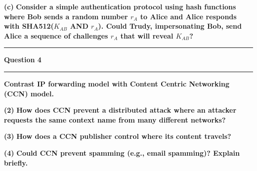 \documentclass[11pt]{article}
\newcommand\question[2]{\vspace{.25in}\hrule\textbf{#1}\vspace{.5em}\hrule\vspace{.10in}}
\renewcommand\part[1]{\vspace{.10in}\textbf{(#1)}}
\begin{document}
\part{c} \textbf{ Consider a simple authentication protocol using hash functions where
Bob sends a random number $r_A$ to Alice and Alice responds with SHA512($K_{AB}$
AND $r_A$). Could Trudy, impersonating Bob, send Alice a sequence of challenges
$r_A$ that will reveal $K_{AB}$?}

\question{Question 4}

\part{1} \textbf{Contrast IP forwarding model with Content Centric Networking (CCN) model.}

\part{2} \textbf{How does CCN prevent a distributed attack where an attacker requests the same context name from many different networks?}

\part{3} \textbf{How does a CCN publisher control where its content travels?}

\part{4} \textbf{Could CCN prevent spamming (e.g., email spamming)? Explain briefly.}
\end{document}
